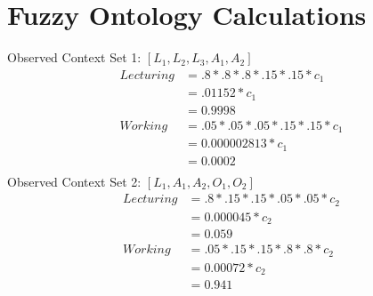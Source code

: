 \documentclass[journal]{vgtc}                %
\begin{document}
\section{Fuzzy Ontology Calculations}
Observed Context Set 1: $[L_1, L_2, L_3, A_1, A_2]$
\begin{align}
                          Lecturing &= .8 * .8 * .8 * .15 * .15 * c_1\\
                                    &= .01152 * c_1\\
                                    &= 0.9998\\
                            Working &= .05 * .05 * .05 * .15 * .15 * c_1\\
                                    &= 0.000002813 * c_1\\
                                    &= 0.0002\\
\end{align}
Observed Context Set 2: $[L_1, A_1, A_2, O_1, O_2]$
\begin{align}
                          Lecturing &= .8 * .15 * .15 * .05 * .05 * c_2\\
                                    &= 0.000045 * c_2\\
                                    &= 0.059\\
                            Working &= .05 * .15 * .15 * .8 * .8 * c_2\\
                                    &= 0.00072 * c_2\\
                                    &= 0.941\\
\end{align}
\end{document}
